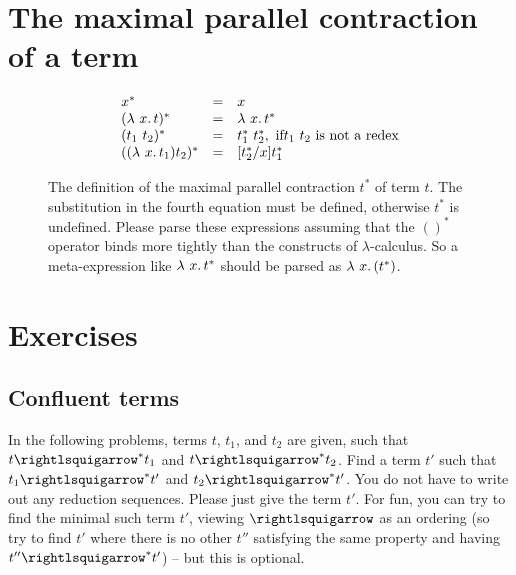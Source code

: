 \section{The maximal parallel contraction of a term}

\begin{figure}
\[
\begin{array}{lll}
x^* & = & x \\
(\lam{x}{t})^* & = & \lam{x}{t^*} \\
(t_1\ t_2)^* & = & t_1^*\ t_2^*,\textnormal{ if} t_1\ t_2\textnormal{ is not a redex} \\
((\lam{x}{t_1}) t_2)^* & = & [t_2^*/x]t_1^*
\end{array}
\]
\caption{The definition of the maximal parallel contraction $t^*$ of term $t$.  The substitution in the fourth
  equation must be defined, otherwise $t^*$ is undefined.  Please parse these expressions
  assuming that the $()^*$ operator binds more tightly than the constructs of $\lambda$-calculus. So a meta-expression
like $\lambda\ x.\, t^*$ should be parsed as $\lambda\ x.\, (t^*)$.}
\label{fig:mpc}
\end{figure}


\section{Exercises}

\subsection{Confluent terms}

In the following problems, terms $t$, $t_1$, and $t_2$ are given, such
that $t\betaa^* t_1$ and $t\betaa^* t_2$.  Find a term $t'$ such
that $t_1\betaa^* t'$ and $t_2\betaa^* t'$.  You do not have to
write out any reduction sequences.  Please just give the term $t'$.
For fun, you can try to find the minimal such term $t'$, viewing $\betaa$
as an ordering (so try to find $t'$ where there is no other $t''$
satisfying the same property and having $t''\betaa^* t'$) -- but
this is optional.

